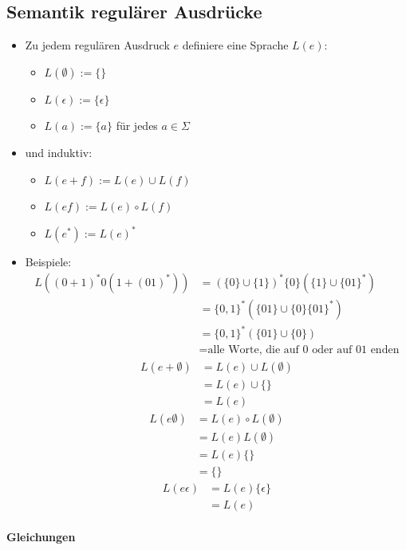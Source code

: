 \documentclass{scrartcl}
\begin{document}
\subsection{Semantik regulärer Ausdrücke}

\begin{itemize}
	\item Zu jedem regulären Ausdruck $e$ definiere eine Sprache $L(e)$:
	\begin{itemize}
		\item $L(\emptyset) := \{\}$
		\item $L(\epsilon) := \{ \epsilon \}$
		\item $L(a) := \{ a \}$ für jedes $a \in \Sigma$
	\end{itemize}
	\item und induktiv:
	\begin{itemize}
		\item $L(e + f) := L(e) \cup L(f)$
		\item $L(ef) := L(e) \circ L(f)$
		\item $L(e^*) := L(e)^*$
	\end{itemize}
	\item Beispiele:
	\begin{align*}
		L((0+1)^* 0 (1 + (01)^*)) &= (\{ 0 \} \cup \{ 1 \})^* \{ 0 \} (\{ 1 \} \cup \{ 01 \}^*) \\
		&= \{ 0,1 \}^* (\{ 01 \} \cup \{ 0 \}  \{ 01 \}^*) \\
		&= \{ 0,1 \}^* (\{ 01 \} \cup \{ 0 \}) \\
		&= \text{alle Worte, die auf 0 oder auf 01 enden}
	\end{align*}
	\begin{align*}
		L(e + \emptyset) &= L(e) \cup L(\emptyset) \\
		&= L(e) \cup \{\} \\
		&= L(e)
	\end{align*}
	\begin{align*}
		L(e \emptyset) &= L(e) \circ L(\emptyset) \\
		&= L(e) L(\emptyset) \\
		&= L(e) \{\} \\
		&= \{\}
	\end{align*}
	\begin{align*}
		L(e \epsilon) &= L(e) \{ \epsilon \} \\
		&= L(e)
	\end{align*}
\end{itemize}

\paragraph{Gleichungen}
\end{document}

